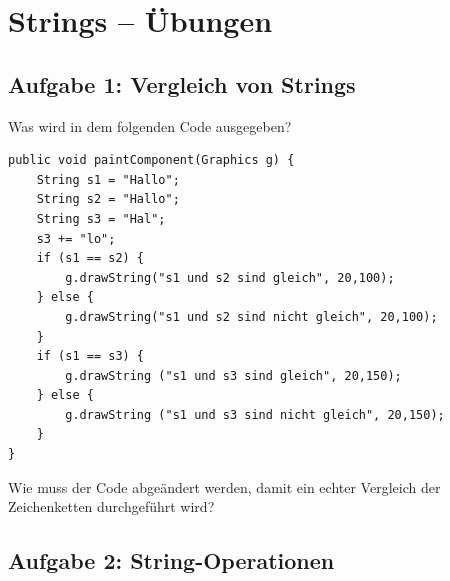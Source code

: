 \clearpage

\rehead[]{\textcolor{lightblue}{AvHG, Inf, My}}
\lohead[]{\textcolor{lightblue}{AvHG, Inf, My}}

\section{Strings -- Übungen}

\subsection{Aufgabe 1: Vergleich von Strings}

\begin{compactenum}[a)]
\item Was wird in dem folgenden Code ausgegeben?

\begin{lstlisting}
public void paintComponent(Graphics g) {
    String s1 = "Hallo";
    String s2 = "Hallo";
    String s3 = "Hal";
    s3 += "lo";
    if (s1 == s2) {
        g.drawString("s1 und s2 sind gleich", 20,100);
    } else {
        g.drawString("s1 und s2 sind nicht gleich", 20,100);
    }
    if (s1 == s3) {
        g.drawString ("s1 und s3 sind gleich", 20,150);
    } else {
        g.drawString ("s1 und s3 sind nicht gleich", 20,150);
    }
}
\end{lstlisting}

\item Wie muss der Code abgeändert werden, damit ein echter Vergleich der
Zeichenketten durchgeführt wird?
\end{compactenum}


\subsection{Aufgabe 2: String-Operationen}

